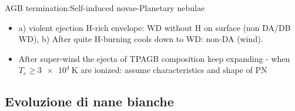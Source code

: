 \begin{frame}{AGB termination:Self-induced novae-Planetary nebulae}
\begin{itemize}
\item a) violent ejection H-rich envelope: WD without H on surface (non DA/DB WD), b) After quite H-burning cools down to WD: non-DA (wind).
\item After super-wind the ejecta of TPAGB composition keep expanding - when $T_e\geq\SI{3e4}{\kelvin}$ are ionized: assume characteristics and shape of PN
\end{itemize}
\end{frame}

\subsection{Evoluzione di nane bianche}

